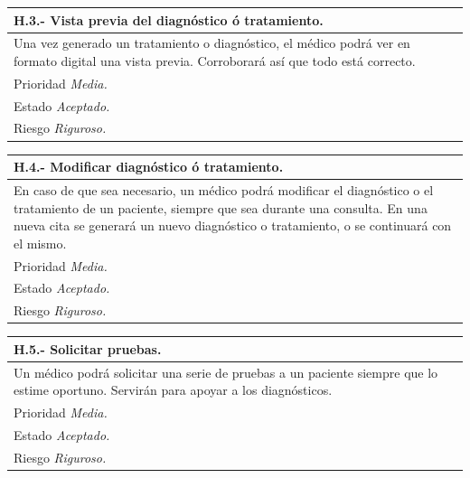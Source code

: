\documentclass[a4paper,oneside,11pt]{book}
\begin{document}
\begin{center}
\begin{tabulary}{15cm}{|L|}
	\hline
		\bf{H.3.- Vista previa del diagnóstico ó tratamiento.} \\
	\hline
		Una vez generado un tratamiento o diagnóstico, el médico podrá ver en formato digital una vista previa. Corroborará así que todo está correcto. \\
	\hline
		Prioridad \textit{Media.} \\
	\hline
		Estado \textit{Aceptado.} \\
	\hline
		Riesgo \textit{Riguroso.} \\
	\hline
\end{tabulary}
\end{center}

\begin{center}
\begin{tabulary}{15cm}{|L|}
	\hline
		\bf{H.4.- Modificar diagnóstico ó tratamiento.} \\
	\hline
			En caso de que sea necesario, un médico podrá modificar el diagnóstico o el tratamiento de un paciente, siempre que sea durante una consulta. En una nueva cita se generará un nuevo diagnóstico o tratamiento, o se continuará con el mismo. \\
	\hline
		Prioridad \textit{Media.} \\
	\hline
		Estado \textit{Aceptado.} \\
	\hline
		Riesgo \textit{Riguroso.} \\
	\hline
\end{tabulary}
\end{center}

\begin{center}
\begin{tabulary}{15cm}{|L|}
	\hline
		\bf{H.5.- Solicitar pruebas.} \\
	\hline
		Un médico podrá solicitar una serie de pruebas a un paciente siempre que lo estime oportuno. Servirán para apoyar a los diagnósticos. \\
	\hline
		Prioridad \textit{Media.} \\
	\hline
		Estado \textit{Aceptado.} \\
	\hline
		Riesgo \textit{Riguroso.} \\
	\hline
\end{tabulary}
\end{center}
\end{document}
